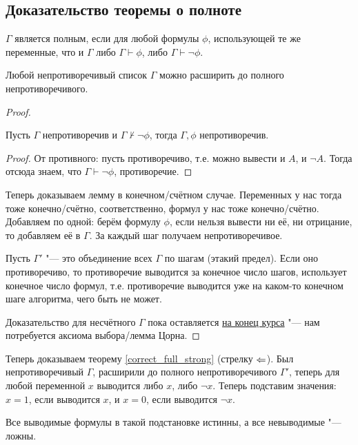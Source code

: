\subsection{Доказательство теоремы о полноте}
\begin{Def}
	$\Gamma$ является полным, если для любой формулы $\phi$, использующей те же переменные, что и $\Gamma$
	либо $\Gamma \vdash \phi$, либо $\Gamma \vdash \lnot \phi$.
\end{Def}
\begin{lemma}\label{consistent_list_extend_to_full}
	Любой непротиворечивый список $\Gamma$ можно расширить до полного непротиворечивого.
\end{lemma}
\begin{proof}
	\begin{assertion}
		Пусть $\Gamma$ непротиворечив и $\Gamma \nvdash \lnot \phi$, тогда
		$\Gamma, \phi$ непротиворечив.
	\end{assertion}
	\begin{proof}
		От противного: пусть противоречиво, т.е. можно вывести и $A$, и $\lnot A$.
		Тогда отсюда знаем, что $\Gamma \vdash \lnot \phi$, противоречие.
	\end{proof}
	Теперь доказываем лемму в конечном/счётном случае.
	Переменных у нас тогда тоже конечно/счётно, соответственно, формул у нас тоже конечно/счётно.
	Добавляем по одной: берём формулу $\phi$, если нельзя вывести ни её, ни отрицание, то добавляем её в $\Gamma$.
	За каждый шаг получаем непротиворечивое.

	Пусть $\Gamma'$ "--- это объединение всех $\Gamma$ по шагам (этакий предел).
	Если оно противоречиво, то противоречие выводится за конечное число шагов, использует конечное число формул,
	т.е. противоречие выводится уже на каком-то конечном шаге алгоритма, чего быть не может.

	Доказательство для несчётного $\Gamma$ пока оставляется \hyperref[zorn_lemma_exmp_list_full]{на конец курса} "--- нам потребуется аксиома выбора/лемма Цорна.
\end{proof}
Теперь доказываем теорему \ref{correct_full_strong} (стрелку $\Leftarrow$).
Был непротиворечивый $\Gamma$, расширили до полного непротиворечивого $\Gamma'$, теперь для любой переменной $x$ выводится либо $x$, либо $\lnot x$.
Теперь подставим значения: $x=1$, если выводится $x$, и $x=0$, если выводится $\lnot x$.
\begin{assertion}\label{interpret_eq_derivability_non_pred}
	Все выводимые формулы в такой подстановке истинны, а все невыводимые "--- ложны.
\end{assertion}
